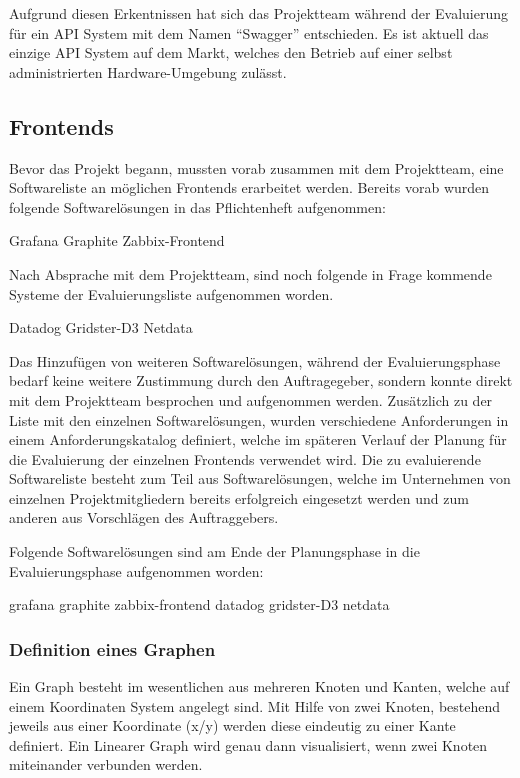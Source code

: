 Aufgrund diesen Erkentnissen hat sich das Projektteam während der Evaluierung
für ein API System mit dem Namen ``Swagger'' entschieden. Es ist aktuell das
einzige API System auf dem Markt, welches den Betrieb auf einer selbst
administrierten Hardware-Umgebung zulässt.
\nl%

\subsection{Frontends}
\label{subsec:frontends}
Bevor das Projekt begann, mussten vorab zusammen mit dem Projektteam, eine
Softwareliste an möglichen Frontends erarbeitet werden. Bereits vorab wurden
folgende Softwarelösungen in das Pflichtenheft aufgenommen:
\begin{outline}
  \1 Grafana
  \1 Graphite
  \1 Zabbix-Frontend
  \end{outline}

Nach Absprache mit dem Projektteam, sind noch folgende in Frage kommende
Systeme der Evaluierungsliste aufgenommen worden.
\begin{outline}
  \1 Datadog
  \1 Gridster-D3
  \1 Netdata
\end{outline}

Das Hinzufügen von weiteren Softwarelösungen, während der Evaluierungsphase
bedarf keine weitere Zustimmung durch den Auftragegeber, sondern konnte direkt
mit dem Projektteam besprochen und aufgenommen werden. Zusätzlich zu der Liste
mit den einzelnen Softwarelösungen, wurden verschiedene Anforderungen in einem
Anforderungskatalog definiert, welche im späteren Verlauf der Planung für die
Evaluierung der einzelnen Frontends verwendet wird. Die zu evaluierende
Softwareliste besteht zum Teil aus Softwarelösungen, welche im Unternehmen von
einzelnen Projektmitgliedern bereits erfolgreich eingesetzt werden und zum
anderen aus Vorschlägen des Auftraggebers.


Folgende Softwarelösungen sind am Ende der Planungsphase in die
Evaluierungsphase aufgenommen worden:

\begin{outline}
  \1 grafana
  \1 graphite
  \1 zabbix-frontend
  \1 datadog
  \1 gridster-D3
  \1 netdata
\end{outline}
\mr%

\subsubsection{Definition eines Graphen}
\label{definition_eines_graphen}
Ein Graph besteht im wesentlichen aus mehreren Knoten und Kanten, welche auf
einem Koordinaten System angelegt sind. Mit Hilfe von zwei Knoten, bestehend
jeweils aus einer Koordinate (x/y) werden diese eindeutig zu einer Kante
definiert. Ein Linearer Graph wird genau dann visualisiert, wenn zwei Knoten
miteinander verbunden werden.

